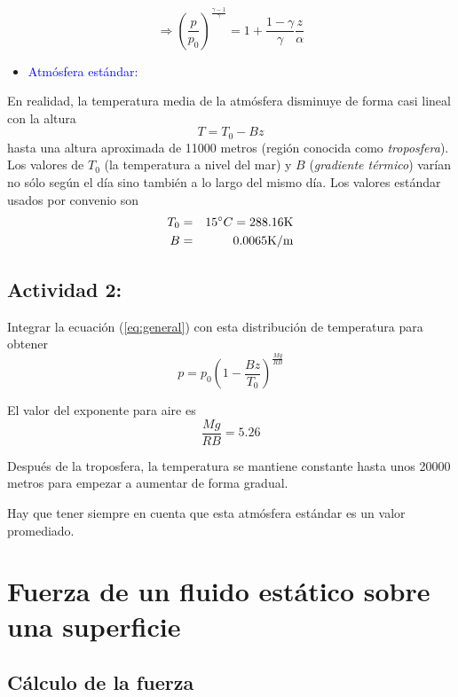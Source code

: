 \begin{equation}
\Rightarrow\boxed{\left(\frac{p}{p_{0}}\right)^{\frac{\gamma-1}{\gamma}}=1+\frac{1-\gamma}{\gamma}\frac{z}{\alpha}}\label{eq:adiabatica}
\end{equation}


\begin{itemize}
\item \textcolor{blue}{Atmósfera estándar:}
\end{itemize}
En realidad, la temperatura media de la atmósfera disminuye de forma
casi lineal con la altura 
\[
T=T_{0}-Bz
\]
 hasta una altura aproximada de 11000 metros (región conocida como
\textit{troposfera}). Los valores de $T_{0}$ (la temperatura a nivel
del mar) y $B$ (\textit{gradiente térmico}) varían no sólo según
el día sino también a lo largo del mismo día. Los valores estándar
usados por convenio son 
\begin{eqnarray*}
T_{0} & = & 15^{\circ}C=288.16\textnormal{K}\\
B & = & 0.0065\textnormal{K/m}
\end{eqnarray*}



\subsection*{Actividad 2:}
Integrar la ecuación (\ref{eq:general}) con esta distribución de
temperatura para obtener 
\begin{equation}
p=p_{0}\left(1-\frac{Bz}{T_{0}}\right)^{\frac{Mg}{RB}}
\end{equation}

El valor del exponente para aire es 
\[
\frac{Mg}{RB}=5.26
\]

Después de la troposfera, la temperatura se mantiene constante hasta
unos 20000 metros para empezar a aumentar de forma gradual.

Hay que tener siempre en cuenta que esta atmósfera estándar es un
valor promediado. 

\section{Fuerza de un fluido estático sobre una superficie}

\subsection{Cálculo de la fuerza}


\begin{center}
\resizebox{0.8\textwidth}{!}{}
\par\end{center}


